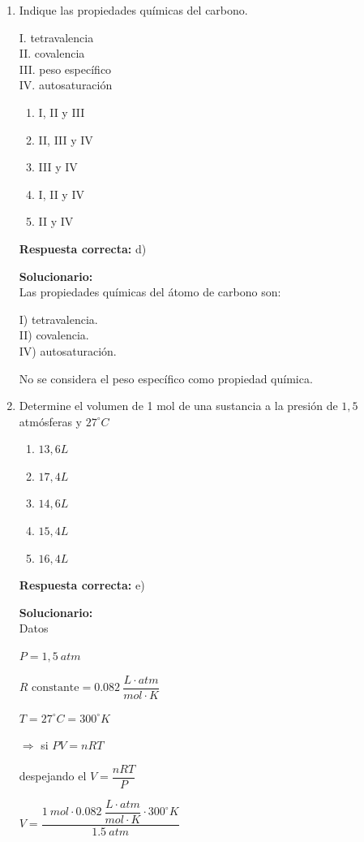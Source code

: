 \begin{enumerate}
	
	\item Indique las propiedades químicas del carbono.
	
	I. tetravalencia\\
	II. covalencia\\
	III. peso específico\\
	IV. autosaturación
	
	\begin{enumerate}[label=\alph*)]
		\item I, II y III
		\item II, III y IV
		\item III y IV
		\item I, II y IV
		\item II y IV
	\end{enumerate}
	\textbf{Respuesta correcta:} d)
	
	\vspace{2mm}
	\textbf{Solucionario:}\\
	
	Las propiedades químicas del átomo de carbono son:
	
	I) tetravalencia.\\
	II) covalencia.\\
	IV) autosaturación.
	
	No se considera el peso específico como propiedad química.
	
	\vspace{6mm}
	
	\item Determine el volumen de 1 mol de una sustancia a la presión de $1,5$ atmósferas y $27^\circ C$
	
	\begin{enumerate}[label=\alph*)]
		\item $13,6L$
		\item $17,4L$
		\item $14,6L$
		\item $15,4L$
		\item $16,4L$
	\end{enumerate}
	\textbf{Respuesta correcta:} e)
	
	\vspace{2mm}
	\textbf{Solucionario:}\\
	
	Datos
	
	$P=1,5\ atm$
	
	$R\text{ constante}=0.082\ \dfrac{L\cdot atm}{mol\cdot K}$
	
	$T=27^\circ C=300^\circ K$
	
	$\Rightarrow$ si \hspace{2mm} $PV=nRT$
	
	despejando el $V=\dfrac{nRT}{P}$
	
	$V=\dfrac{1\ mol\cdot 0.082\ \dfrac{L\cdot atm}{mol\cdot K}\cdot 300^\circ K}{1.5\ atm}$
	
	
	\vspace{6mm}
	
\end{enumerate}





